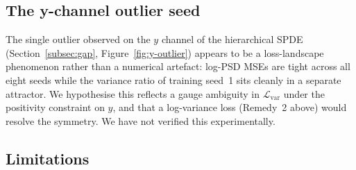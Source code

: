 \documentclass[review,12pt]{elsarticle}
\begin{document}
\subsection{The y-channel outlier seed}

The single outlier observed on the \(y\) channel of the
hierarchical SPDE (Section~\ref{subsec:gap},
Figure~\ref{fig:y-outlier}) appears to be a loss-landscape
phenomenon rather than a numerical artefact: log-PSD MSEs are
tight across all eight seeds while the variance ratio of training
seed~1 sits cleanly in a separate attractor. We hypothesise this
reflects a gauge ambiguity in
\(\mathcal{L}_{\mathrm{var}}\) under the positivity constraint
on \(y\), and that a log-variance loss (Remedy~2 above) would
resolve the symmetry. We have not verified this experimentally.

\subsection{Limitations}
\end{document}
